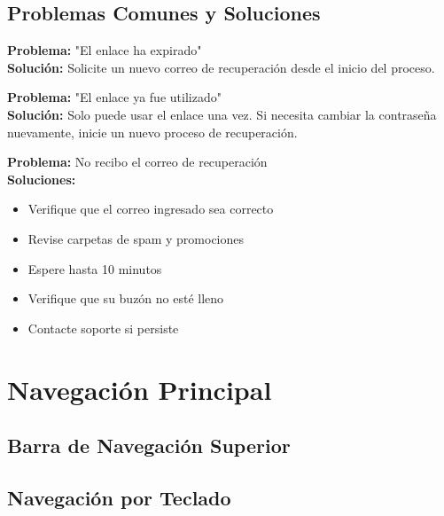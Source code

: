 \documentclass[11pt,a4paper,twoside]{book}
\begin{document}
\section{Problemas Comunes y Soluciones}

\begin{errorbox}
\textbf{Problema:} "El enlace ha expirado"\\
\textbf{Solución:} Solicite un nuevo correo de recuperación desde el inicio del proceso.
\end{errorbox}

\begin{errorbox}
\textbf{Problema:} "El enlace ya fue utilizado"\\
\textbf{Solución:} Solo puede usar el enlace una vez. Si necesita cambiar la contraseña nuevamente, inicie un nuevo proceso de recuperación.
\end{errorbox}

\begin{errorbox}
\textbf{Problema:} No recibo el correo de recuperación\\
\textbf{Soluciones:}
\begin{itemize}
    \item Verifique que el correo ingresado sea correcto
    \item Revise carpetas de spam y promociones
    \item Espere hasta 10 minutos
    \item Verifique que su buzón no esté lleno
    \item Contacte soporte si persiste
\end{itemize}
\end{errorbox}


\chapter{Navegación Principal}
\section{Barra de Navegación Superior}
\section{Navegación por Teclado}
\end{document}
